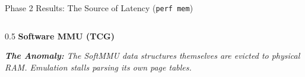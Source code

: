\documentclass[aspectratio=169]{beamer} %
\begin{document}
\begin{frame}{Phase 2 Results: The Source of Latency (\texttt{perf mem})}
\begin{columns}[T]
          \begin{column}{0.5\textwidth}
              \textbf{Software MMU (TCG)}
              \vspace{0.1cm}
              \begin{table}[]
                  \renewcommand{\arraystretch}{1.2}
              \end{table}
              \vspace{0.1cm}
              \footnotesize \textit{\textbf{The Anomaly:} The SoftMMU data structures themselves are evicted to physical RAM. Emulation stalls parsing its own page tables.}
          \end{column}
      \end{columns}
  \end{frame}
\end{document}
